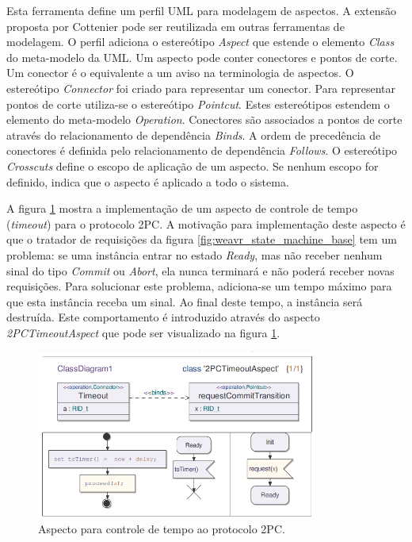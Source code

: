 Esta ferramenta define um perfil UML para modelagem de aspectos. A extensão proposta por Cottenier pode ser reutilizada em outras
ferramentas de modelagem. O perfil adiciona o estereótipo \textit{Aspect} que estende o elemento \textit{Class} do meta-modelo da UML. Um aspecto pode 
conter conectores e pontos de corte. Um conector é o equivalente a um aviso na terminologia de aspectos. O estereótipo
\textit{Connector} foi criado para representar um conector. Para representar pontos de corte utiliza-se o estereótipo \textit{Pointcut}. Estes
estereótipos estendem o elemento do meta-modelo \textit{Operation}. Conectores são associados a pontos de corte através do relacionamento de
dependência \textit{Binds}. A ordem de precedência de conectores é definida pelo relacionamento de dependência \textit{Follows}. O estereótipo
\textit{Crosscuts} define o escopo de aplicação de um aspecto. Se nenhum escopo for definido, indica que o aspecto é aplicado a todo o sistema.

A figura \ref{fig:weavr_timeout} mostra a implementação de um aspecto de controle de tempo (\textit{timeout}) para o protocolo 2PC. A motivação para
implementação deste aspecto é que o tratador de requisições da figura \ref{fig:weavr_state_machine_base} tem um problema: se uma instância entrar no
estado \textit{Ready}, mas não receber nenhum sinal do tipo \textit{Commit} ou \textit{Abort}, ela nunca terminará e não poderá receber
novas requisições. Para solucionar este problema, adiciona-se um tempo máximo para que esta instância receba um sinal. Ao final deste tempo, a
instância será destruída. Este comportamento é introduzido através do aspecto \textit{2PCTimeoutAspect} que pode ser visualizado na figura
\ref{fig:weavr_timeout}. 

\begin{figure}
	\centering
	\includegraphics[width=350px]{img/weavr_timeout.png}
	\caption{Aspecto para controle de tempo ao protocolo 2PC.}\label{fig:weavr_timeout}
\end{figure}


